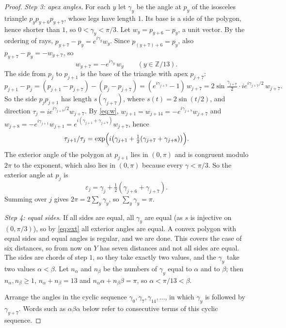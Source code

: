 \documentclass[11pt]{amsart}
\theoremstyle{definition}
\theoremstyle{remark}
\newcommand{\Z}{\mathbb{Z}}
\begin{document}
\begin{proof}
\emph{Step 3: apex angles.} For each $y$ let $\gamma_y$ be the angle at $p_y$ of the isosceles triangle
$p_yp_{y+6}p_{y+7}$, whose legs have length $1$. Its base is a side of the polygon, hence shorter than $1$,
so $0<\gamma_y<\pi/3$. Let $w_y=p_{y+6}-p_y$, a unit vector. By the ordering of rays,
$p_{y+7}-p_y=e^{i\gamma_y}w_y$. Since $p_{(y+7)+6}=p_y$, also $p_{y+7}-p_y=-w_{y+7}$, so
\begin{equation}\label{eq:w}
  w_{y+7}=-e^{i\gamma_y}\,w_y\qquad(y\in\Z/13).
\end{equation}
The side from $p_j$ to $p_{j+1}$ is the base of the triangle with apex $p_{j+7}$:
\[
  p_{j+1}-p_j=(p_{j+1}-p_{j+7})-(p_j-p_{j+7})=(e^{i\gamma_{j+7}}-1)\,w_{j+7}
  =2\sin\tfrac{\gamma_{j+7}}2\cdot ie^{i\gamma_{j+7}/2}\,w_{j+7}.
\]
So the side $p_jp_{j+1}$ has length $s(\gamma_{j+7})$, where $s(t)=2\sin(t/2)$, and direction
$\tau_j=ie^{i\gamma_{j+7}/2}w_{j+7}$. By \eqref{eq:w}, $w_{j+1}=w_{j+14}=-e^{i\gamma_{j+7}}w_{j+7}$ and
$w_{j+8}=-e^{i\gamma_{j+1}}w_{j+1}=e^{i(\gamma_{j+1}+\gamma_{j+7})}w_{j+7}$, hence
\[
  \tau_{j+1}/\tau_j=\exp\Bigl(i\bigl(\gamma_{j+1}+\tfrac12(\gamma_{j+7}+\gamma_{j+8})\bigr)\Bigr).
\]
The exterior angle of the polygon at $p_{j+1}$ lies in $(0,\pi)$ and is congruent modulo $2\pi$ to the
exponent, which also lies in $(0,\pi)$ because every $\gamma<\pi/3$. So the exterior angle at $p_j$ is
\begin{equation}\label{eq:ext}
  \varepsilon_j=\gamma_j+\tfrac12(\gamma_{j+6}+\gamma_{j+7}).
\end{equation}
Summing over $j$ gives $2\pi=2\sum_y\gamma_y$, so $\sum_y\gamma_y=\pi$.

\emph{Step 4: equal sides.} If all sides are equal, all $\gamma_y$ are equal (as $s$ is injective on
$(0,\pi/3)$), so by \eqref{eq:ext} all exterior angles are equal. A convex polygon with equal sides and equal
angles is regular, and we are done. This covers the case of six distances, so from now on $Y$ has seven
distances and not all sides are equal. The sides are chords of step $1$, so they take exactly two values, and
the $\gamma_y$ take two values $\alpha<\beta$. Let $n_\alpha$ and $n_\beta$ be the numbers of $\gamma_y$ equal to
$\alpha$ and to $\beta$; then $n_\alpha,n_\beta\ge1$, $n_\alpha+n_\beta=13$ and
$n_\alpha\alpha+n_\beta\beta=\pi$, so $\alpha<\pi/13<\beta$.

Arrange the angles in the cyclic sequence $\gamma_0,\gamma_7,\gamma_{14},\dots$, in which $\gamma_y$ is
followed by $\gamma_{y+7}$. Words such as $\alpha\beta\alpha$ below refer to consecutive terms of this cyclic
sequence.


\end{proof}
\end{document}
